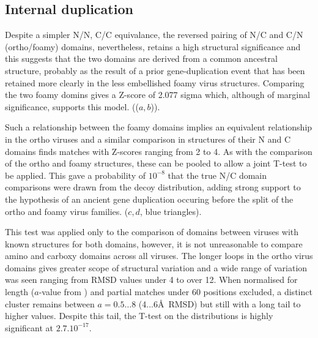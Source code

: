 %
%
%
%

\subsection{Internal duplication}

Despite a simpler N/N, C/C equivalance, the reversed pairing of N/C and C/N (ortho/foamy)
domains, nevertheless, retains a high structural significance and this
suggests that the two domains are derived from a common ancestral structure, probably
as the result of a prior gene-duplication event that has been retained more clearly
in the less embellished foamy virus structures.   Comparing the two foamy domins gives
a Z-score of 2.077 sigma which, although of marginal significance, supports this model.
(($a,b$)).

Such a relationship between the foamy domains implies an equivalent relationship
in the ortho viruses and a similar comparison in structures of their N and C domains
finds matches with Z-scores ranging from 2 to 4.   As with the comparison of the 
ortho and foamy structures, these can be pooled to allow a joint T-test to be applied.  
This gave a probability of $10^{-8}$ that the true N/C domain
comparisons were drawn from the decoy distribution, adding strong support to the
hypothesis of an ancient gene duplication occuring before the split of the ortho 
and foamy virus families. ($c,d$, blue triangles).

This test was applied only to the comparison of domains between viruses with 
known structures for both domains, however, it is not unreasonable to compare
amino and carboxy domains across all viruses.  The longer loops in the ortho virus
domains gives greater scope of structural variation and a wide range of variation
was seen ranging from RMSD values under 4 to over 12.  
When normalised for length ($a$-value from ) and partial matches under
60 positions excluded, a distinct cluster remains between $a=0.5\ldots8$ (4...6\AA\ 
RMSD) but still with a long tail to higher values.
Despite this tail, the T-test on the distributions is highly significant at $2.7.10^{-17}$.

